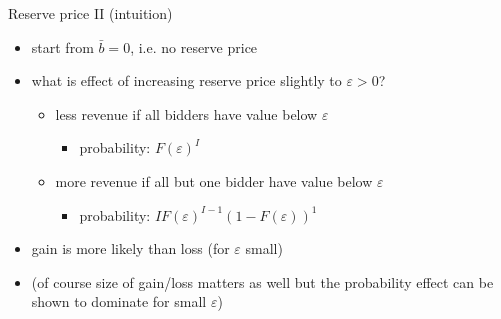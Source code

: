 \documentclass[bigger]{beamer}
\begin{document}
\begin{frame}[label={sec:org6952565}]{Reserve price II (intuition)}
\begin{itemize}
\item start from \(\bar b=0\), i.e. no reserve price
\item what is effect of increasing reserve price slightly to \(\varepsilon>0\)?
\begin{itemize}
\item less revenue if all bidders have value below \(\varepsilon\)
\begin{itemize}
\item probability: \(F(\varepsilon)^I\)
\end{itemize}
\item more revenue if all but one bidder have value below \(\varepsilon\)
\begin{itemize}
\item probability: \(I F(\varepsilon)^{I-1} (1-F(\varepsilon))^1\)
\end{itemize}
\end{itemize}
\item gain is more likely than loss (for \(\varepsilon\) small)
\item (of course size of gain/loss matters as well but the probability effect can be shown to dominate for small \(\varepsilon\))
\end{itemize}
\end{frame}
\end{document}
